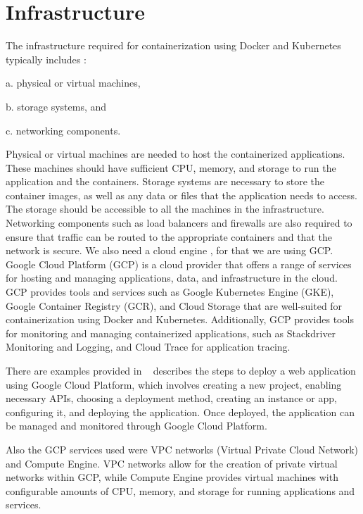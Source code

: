 \section{Infrastructure}
The infrastructure required for containerization using Docker and Kubernetes typically includes :

a. physical or virtual machines,

b. storage systems, and 

c. networking components. 

Physical or virtual machines are needed to host the containerized applications. These machines should have sufficient CPU, memory, and storage to run the application and the containers. Storage systems are necessary to store the container images, as well as any data or files that the application needs to access. The storage should be accessible to all the machines in the infrastructure. Networking components such as load balancers and firewalls are also required to ensure that traffic can be routed to the appropriate containers and that the network is secure.
We also need a cloud engine , for that we are using GCP. Google Cloud Platform (GCP) is a cloud provider that offers a range of services for hosting and managing applications, data, and infrastructure in the cloud. GCP provides tools and services such as Google Kubernetes Engine (GKE), Google Container Registry (GCR), and Cloud Storage that are well-suited for containerization using Docker and Kubernetes. Additionally, GCP provides tools for monitoring and managing containerized applications, such as Stackdriver Monitoring and Logging, and Cloud Trace for application tracing.

There are examples provided in ~\cite{gupta2020deploy} describes the steps to deploy a web application using Google Cloud Platform, which involves creating a new project, enabling necessary APIs, choosing a deployment method, creating an instance or app, configuring it, and deploying the application. Once deployed, the application can be managed and monitored through Google Cloud Platform.

Also the GCP services used were VPC networks (Virtual Private Cloud Network) and Compute Engine. VPC networks allow for the creation of private virtual networks within GCP, while Compute Engine provides virtual machines with configurable amounts of CPU, memory, and storage for running applications and services.








